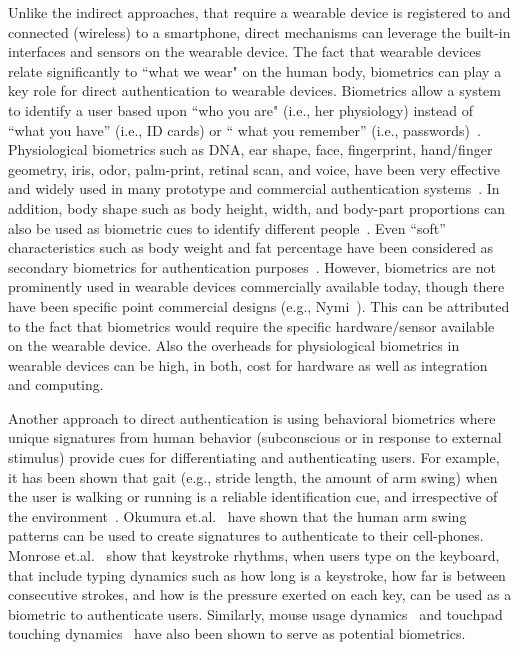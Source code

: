 Unlike the indirect approaches, that require a wearable device is registered to
and connected (wireless) to a smartphone, direct
mechanisms can leverage the built-in interfaces and sensors on the
wearable device. The fact that wearable devices relate significantly to ``what we wear" on the
human body, biometrics can play a key role for direct authentication to wearable
devices. Biometrics allow a system to identify a user based upon ``who you
are" (i.e., her physiology) instead of ``what you
have'' (i.e., ID cards) or `` what you remember'' (i.e.,
passwords)~\cite{jain2004introduction,o2003comparing,yampolskiy2007motor}.
Physiological biometrics such as DNA, ear shape, face, fingerprint,
hand/finger geometry,
iris, odor, palm-print, retinal scan, and voice, have been very effective and
widely used in many prototype and commercial authentication systems~\cite{***}.
In addition, body shape such as body height, width, and body-part proportions
can also be used as biometric cues to identify different
people~\cite{collins2002silhouette}. Even ``soft'' characteristics such as
body weight and fat percentage have been considered as secondary biometrics
for authentication purposes~\cite{ailisto2006soft}. However, biometrics are
not prominently used in wearable devices commercially available today, though
there have been specific point commercial designs (e.g., Nymi~\cite{nymi}). This can be attributed to the
fact that biometrics would require the specific hardware/sensor available on
the wearable device. Also the overheads for physiological biometrics in
wearable devices can be high, in both, cost for hardware as well as
integration and computing.

Another approach to direct authentication is using behavioral biometrics
where unique signatures from human behavior (subconscious
or in response to external stimulus) provide cues for differentiating and
authenticating users. For example, it has been shown that gait (e.g.,
stride length, the
amount of arm swing) when the user is walking or
running is a reliable identification cue, and irrespective of the
environment~\cite{stevenage1999visual}. Okumura et.al.~\cite{okumura2006study}
have shown that the human arm swing patterns can be used to create signatures
to authenticate to their cell-phones. Monrose
et.al.~\cite{monrose2000keystroke} show that keystroke rhythms, when
users type on the keyboard, that include typing dynamics such as how
long is a keystroke, how far is between consecutive strokes, and how is the
pressure exerted on each key, can be used as a biometric to authenticate
users. Similarly, mouse usage dynamics~\cite{jorgensen2011mouse} and touchpad
touching dynamics~\cite{bo2013silentsense,de2012touch} have also been shown to
serve as potential biometrics.

